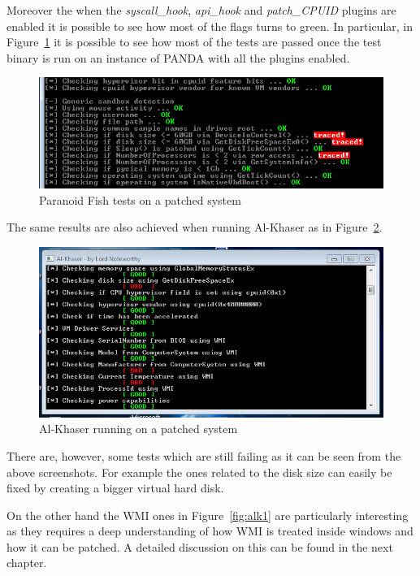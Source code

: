 Moreover the when the \textit{syscall\_hook}, \textit{api\_hook} and \textit{patch\_CPUID} plugins are enabled it is possible to see how most of the flags turns to green. In particular, in Figure~\ref{fig:res1} it is possible to see how most of the tests are passed once the test binary is run on an instance of PANDA with all the plugins enabled.

\begin{figure}[htp]
    \centering
    \includegraphics[width=\linewidth]{images/par2.png}%
    \caption{Paranoid Fish tests on a patched system}%
    \label{fig:res1}%
\end{figure}

The same results are also achieved when running Al-Khaser as in Figure~\ref{fig:alk2}.

\begin{figure}[htp]
    \centering
    \includegraphics[width=\linewidth]{images/al2.png}%
    \caption{Al-Khaser running on a patched system}%
    \label{fig:alk2}%
\end{figure}

There are, however, some tests which are still failing as it can be seen from the above screenshots. For example the ones related to the disk size can easily be fixed by creating a bigger virtual hard disk.

On the other hand the WMI ones in Figure~\ref{fig:alk1} are particularly interesting as they requires a deep understanding of how WMI is treated inside windows and how it can be patched. A detailed discussion on this can be found in the next chapter. 

